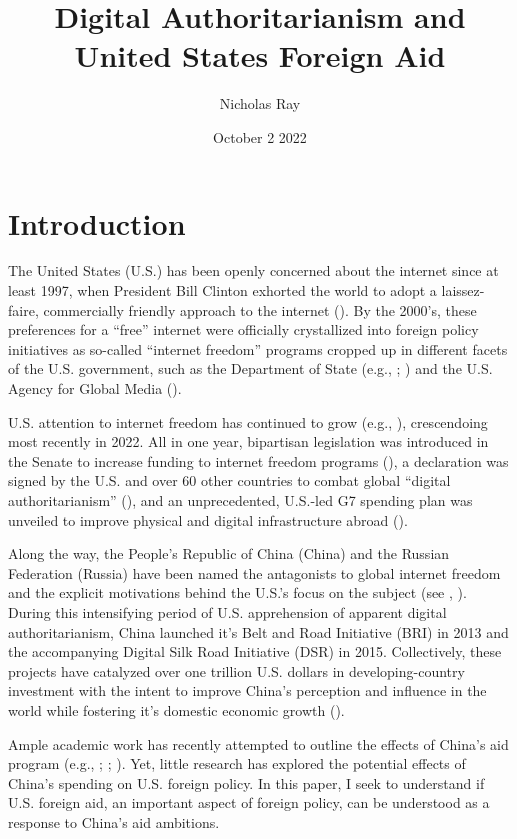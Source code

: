 \documentclass{article}
\title{\vspace{-2.75cm}Digital Authoritarianism and United States Foreign Aid\vspace{-0.5cm}}
\author{Nicholas Ray}
\date{\vspace{-0.30cm}October 2 2022\vspace{-1cm}}
\begin{document}
\maketitle
\section*{Introduction}
The United States (U.S.) has been openly concerned about the internet since at least 1997, when President Bill Clinton exhorted the world to adopt a laissez-faire, commercially friendly approach to the internet (\cite{government1997}). By the 2000's, these preferences for a ``free'' internet were officially crystallized into foreign policy initiatives as so-called ``internet freedom'' programs cropped up in different facets of the U.S. government, such as the Department of State (e.g., \cite{henry2014}; \cite{government2021a}) and the U.S. Agency for Global Media (\cite{government2022}).

U.S. attention to internet freedom has continued to grow (e.g., \cite{government2010}), crescendoing most recently in 2022. All in one year, bipartisan legislation was introduced in the Senate to increase funding to internet freedom programs (\cite{government2022a}), a declaration was signed by the U.S. and over 60 other countries to combat global ``digital authoritarianism'' (\cite{government2022b}), and an unprecedented, U.S.-led G7 spending plan was unveiled to improve physical and digital infrastructure abroad (\cite{government2022c}). 

Along the way, the People's Republic of China (China) and the Russian Federation (Russia) have been named the antagonists to global internet freedom and the explicit motivations behind the U.S.'s focus on the subject (see \cite{government2010}, \cite{government2022b}). During this intensifying period of U.S. apprehension of apparent digital authoritarianism, China launched it's Belt and Road Initiative (BRI) in 2013 and the accompanying Digital Silk Road Initiative (DSR) in 2015. Collectively, these projects have catalyzed over one trillion U.S. dollars in developing-country investment with the intent to improve China's perception and influence in the world while fostering it's domestic economic growth (\cite{dreher2022}).

Ample academic work has recently attempted to outline the effects of China's aid program (e.g., \cite{blair2021}; \cite{eichenauer2021}; \cite{dreher2018}). Yet, little research has explored the potential effects of China's spending on U.S. foreign policy. In this paper, I seek to understand if U.S. foreign aid, an important aspect of foreign policy, can be understood as a response to China's aid ambitions. 
\end{document}
